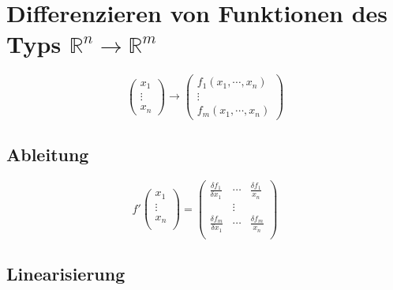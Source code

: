 \section{Differenzieren von Funktionen des Typs $\mathbb{R}^n \rightarrow \mathbb{R}^m$}

\begin{displaymath}
	\begin{pmatrix}
		x_1 \\ 
		\vdots \\ 
		x_n
	\end{pmatrix}	
	\rightarrow
	\begin{pmatrix}
		f_1(x_1,\cdots , x_n) \\ 
		\vdots \\ 
		f_m(x_1,\cdots , x_n)
	\end{pmatrix}
\end{displaymath}

\subsection{Ableitung}

\begin{displaymath}
	f'
	\begin{pmatrix}
		x_1 \\
		\vdots \\
		x_n \\
	\end{pmatrix}
	=
	\begin{pmatrix}
		\frac{\delta f_1}{\delta x_1} & \cdots & \frac{\delta f_1}{x_n} \\
		& \vdots & \\
		\frac{\delta f_m}{\delta x_1} & \cdots & \frac{\delta f_m}{x_n} \\
	\end{pmatrix}
\end{displaymath}

\subsection{Linearisierung}

